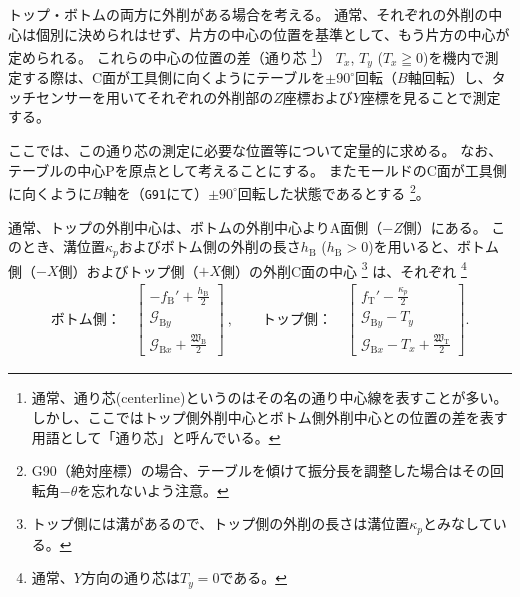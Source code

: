 


トップ・ボトムの両方に外削がある場合を考える。
通常、それぞれの外削の中心は個別に決められはせず、片方の中心の位置を基準として、もう片方の中心が定められる。
これらの中心の位置の差（通り芯
\footnote{通常、通り芯(centerline)というのはその名の通り中心線を表すことが多い。
しかし、ここではトップ側外削中心とボトム側外削中心との位置の差を表す用語として「通り芯」と呼んでいる。}）
$T_x$, $T_y$ ($T_x \geqq 0$)を機内で測定する際は、C面が工具側に向くようにテーブルを$\pm90^\circ$回転（$B$軸回転）し、タッチセンサーを用いてそれぞれの外削部の$Z$座標および$Y$座標を見ることで測定する。

ここでは、この通り芯の測定に必要な位置等について定量的に求める。
なお、テーブルの中心Pを原点として考えることにする。
またモールドのC面が工具側に向くように$B$軸を（\verb|G91|にて）$\pm90^\circ$回転した状態であるとする
\footnote{G90（絶対座標）の場合、テーブルを傾けて振分長を調整した場合はその回転角$-\theta$を忘れないよう注意。}。



通常、トップの外削中心は、ボトムの外削中心よりA面側（$-Z$側）にある。
このとき、溝位置$\kappa_p$およびボトム側の外削の長さ$h_\mathrm B$ ($h_\mathrm B > 0$)を用いると、ボトム側（$-X$側）およびトップ側（$+X$側）の外削C面の中心
\footnote{トップ側には溝があるので、トップ側の外削の長さは溝位置$\kappa_p$とみなしている。}
は、それぞれ
\footnote{通常、$Y$方向の通り芯は$T_y=0$である。}
\begin{align*}
  \text{ボトム側：}\quad
  \left[
    \begin{array}{c}
      \displaystyle -f_\mathrm B'+\frac{h_\mathrm B}2\\[5pt]
      \mathcal G_{\mathrm By}\\[3pt]
      \displaystyle \mathcal G_{\mathrm Bx}+\frac{\mathfrak W_\mathrm B}2
    \end{array}
    \right]~, \qquad
  \text{トップ側：}\quad
  \left[
    \begin{array}{c}
      \displaystyle f_\mathrm T'-\frac{\kappa_p}2\\[5pt]
      \mathcal G_{\mathrm By}-T_y\\[3pt]
      \displaystyle \mathcal G_{\mathrm Bx}-T_x+\frac{\mathfrak W_\mathrm T}2
    \end{array}
  \right].
\end{align*}



